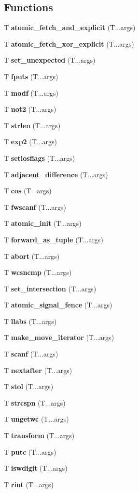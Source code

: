 \subsection*{Functions}
\begin{DoxyCompactItemize}
\item 
T {\bf atomic\+\_\+fetch\+\_\+and\+\_\+explicit} (T...\+args)
\item 
T {\bf atomic\+\_\+fetch\+\_\+xor\+\_\+explicit} (T...\+args)
\item 
T {\bf set\+\_\+unexpected} (T...\+args)
\item 
T {\bf fputs} (T...\+args)
\item 
T {\bf modf} (T...\+args)
\item 
T {\bf not2} (T...\+args)
\item 
T {\bf strlen} (T...\+args)
\item 
T {\bf exp2} (T...\+args)
\item 
T {\bf setiosflags} (T...\+args)
\item 
T {\bf adjacent\+\_\+difference} (T...\+args)
\item 
T {\bf cos} (T...\+args)
\item 
T {\bf fwscanf} (T...\+args)
\item 
T {\bf atomic\+\_\+init} (T...\+args)
\item 
T {\bf forward\+\_\+as\+\_\+tuple} (T...\+args)
\item 
T {\bf abort} (T...\+args)
\item 
T {\bf wcsncmp} (T...\+args)
\item 
T {\bf set\+\_\+intersection} (T...\+args)
\item 
T {\bf atomic\+\_\+signal\+\_\+fence} (T...\+args)
\item 
T {\bf llabs} (T...\+args)
\item 
T {\bf make\+\_\+move\+\_\+iterator} (T...\+args)
\item 
T {\bf scanf} (T...\+args)
\item 
T {\bf nextafter} (T...\+args)
\item 
T {\bf stol} (T...\+args)
\item 
T {\bf strcspn} (T...\+args)
\item 
T {\bf ungetwc} (T...\+args)
\item 
T {\bf transform} (T...\+args)
\item 
T {\bf putc} (T...\+args)
\item 
T {\bf iswdigit} (T...\+args)
\item 
T {\bf rint} (T...\+args)

\end{DoxyCompactItemize}

